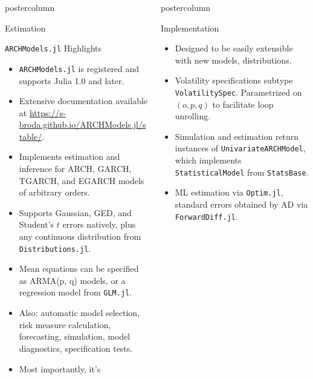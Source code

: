\documentclass{beamer}
\begin{document}
\begin{frame}[fragile]
\begin{columns}
\begin{column}{.48\textwidth}
\begin{beamercolorbox}[center]{postercolumn}
\begin{myblock}{Estimation}
\begin{itemize}
\end{itemize}
\end{myblock}\vfill
\begin{myblock}{\texttt{ARCHModels.jl} Highlights}
\begin{itemize}
\item \texttt{ARCHModels.jl} is registered and supports Julia 1.0 and later.
\item Extensive documentation available at \url{https://s-broda.github.io/ARCHModels.jl/stable/}.
\item Implements estimation and inference for ARCH, GARCH, TGARCH, and EGARCH models of arbitrary orders.
\item Supports Gaussian, GED, and Student's $t$ errors natively, plus {\color{red}any} continuous distribution from \texttt{Distributions.jl}.
\item Mean equations can be specified as {\color{red}ARMA(p, q)} models, or a {\color{red}regression model} from \texttt{GLM.jl}.
\item Also: automatic model selection, risk measure calculation, forecasting, simulation, model diagnostics, specification tests.
\item Most importantly, it's\\
\end{itemize}
\end{myblock}\vfill
\end{beamercolorbox}
\end{column}



\begin{column}{.48\textwidth}
\begin{beamercolorbox}[center]{postercolumn}
\begin{myblock}{Implementation}
\begin{itemize}
\item Designed to be easily {\color{red}extensible} with new models, distributions.
\item Volatility specifications subtype \texttt{VolatilitySpec}. Parametrized on $(o, p, q)$ to facilitate loop unrolling.
\item Simulation and estimation return instances of \texttt{UnivariateARCHModel}, which implements \texttt{StatisticalModel} from \texttt{StatsBase}.
\item ML estimation via \texttt{Optim.jl}, standard errors obtained by AD via \texttt{ForwardDiff.jl}.
\end{itemize}
\end{myblock}\vfill


\end{beamercolorbox}
\end{column}
\end{columns}
\end{frame}
\end{document}
